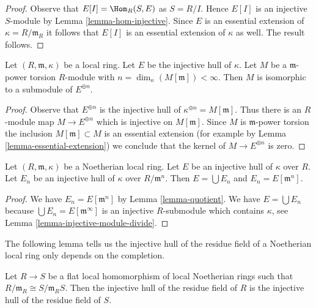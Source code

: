 \begin{proof}
Observe that $E[I] = \Hom_R(S, E)$ as $S = R/I$. Hence $E[I]$ is an injective
$S$-module by Lemma \ref{lemma-hom-injective}. Since $E$ is an essential
extension of $\kappa = R/\mathfrak m_R$ it follows that $E[I]$ is an
essential extension of $\kappa$ as well. The result follows.
\end{proof}

\begin{lemma}
\label{lemma-torsion-submodule-sum-injective-hulls}
Let $(R, \mathfrak m, \kappa)$ be a local ring.
Let $E$ be the injective hull of $\kappa$.
Let $M$ be a $\mathfrak m$-power torsion $R$-module
with $n = \dim_\kappa(M[\mathfrak m]) < \infty$.
Then $M$ is isomorphic to a submodule of $E^{\oplus n}$.
\end{lemma}

\begin{proof}
Observe that $E^{\oplus n}$ is the injective hull of
$\kappa^{\oplus n} = M[\mathfrak m]$. Thus there is an $R$-module map
$M \to E^{\oplus n}$ which is injective on $M[\mathfrak m]$.
Since $M$ is $\mathfrak m$-power torsion the inclusion
$M[\mathfrak m] \subset M$ is an essential extension
(for example by Lemma \ref{lemma-essential-extension})
we conclude that the kernel of $M \to E^{\oplus n}$ is zero.
\end{proof}

\begin{lemma}
\label{lemma-union-artinian}
Let $(R, \mathfrak m, \kappa)$ be a Noetherian local ring.
Let $E$ be an injective hull of $\kappa$ over $R$.
Let $E_n$ be an injective hull of $\kappa$ over $R/\mathfrak m^n$.
Then $E = \bigcup E_n$ and $E_n = E[\mathfrak m^n]$.
\end{lemma}

\begin{proof}
We have $E_n = E[\mathfrak m^n]$ by Lemma \ref{lemma-quotient}.
We have $E = \bigcup E_n$ because $\bigcup E_n = E[\mathfrak m^\infty]$
is an injective $R$-submodule which contains $\kappa$, see
Lemma \ref{lemma-injective-module-divide}.
\end{proof}

\noindent
The following lemma tells us the injective hull of the residue
field of a Noetherian local ring only depends on the completion.

\begin{lemma}
\label{lemma-compare}
Let $R \to S$ be a flat local homomorphism of local Noetherian rings
such that $R/\mathfrak m_R \cong S/\mathfrak m_R S$.
Then the injective hull of the residue field
of $R$ is the injective hull of the residue field of $S$.
\end{lemma}

